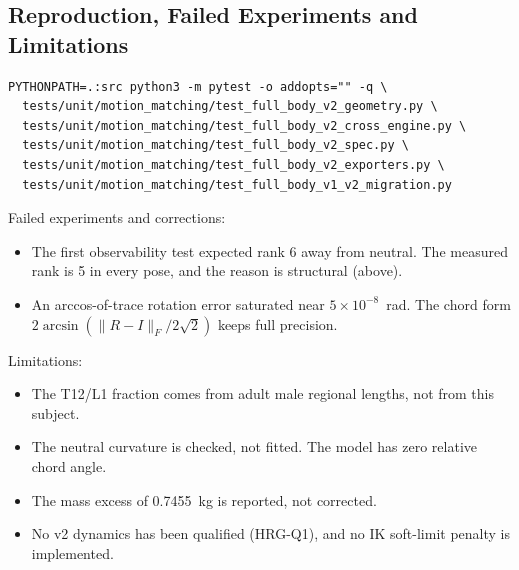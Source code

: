 \documentclass[11pt,a4paper]{article}
\begin{document}
\subsection{Reproduction, Failed Experiments and Limitations}
\begin{verbatim}
PYTHONPATH=.:src python3 -m pytest -o addopts="" -q \
  tests/unit/motion_matching/test_full_body_v2_geometry.py \
  tests/unit/motion_matching/test_full_body_v2_cross_engine.py \
  tests/unit/motion_matching/test_full_body_v2_spec.py \
  tests/unit/motion_matching/test_full_body_v2_exporters.py \
  tests/unit/motion_matching/test_full_body_v1_v2_migration.py
\end{verbatim}
Failed experiments and corrections:
\begin{itemize}
\item The first observability test expected rank 6 away from neutral. The
measured rank is 5 in every pose, and the reason is structural (above).
\item An arccos-of-trace rotation error saturated near $5\times10^{-8}$~rad.
The chord form $2\arcsin(\lVert R-I\rVert_F/2\sqrt2)$ keeps full precision.
\end{itemize}
Limitations:
\begin{itemize}
\item The T12/L1 fraction comes from adult male regional lengths, not from
this subject.
\item The neutral curvature is checked, not fitted. The model has zero
relative chord angle.
\item The mass excess of 0.7455~kg is reported, not corrected.
\item No v2 dynamics has been qualified (HRG-Q1), and no IK soft-limit
penalty is implemented.
\end{itemize}
\end{document}
